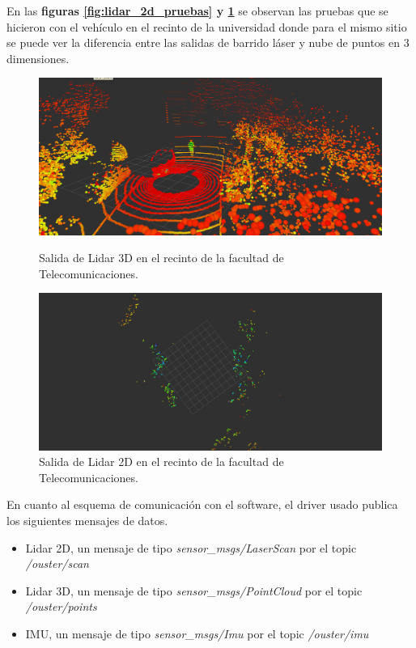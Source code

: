 En las \textbf{figuras \ref{fig:lidar_2d_pruebas} y \ref{fig:lidar_3d_pruebas}} se observan las pruebas que se hicieron con el vehículo en el recinto 
de la universidad donde para el mismo sitio se puede ver la diferencia entre las salidas de barrido láser y nube de puntos en 3 dimensiones.



\begin{figure}[htbp]
  \centering
  \begin{minipage}[b]{0.45\textwidth}
    \centering
    \includegraphics[width=\textwidth]{images/lidar3d_2.png}
    \caption{Salida de Lidar 3D en el recinto de la facultad de Telecomunicaciones.}
    \label{fig:lidar_2d_pruebas}
  \end{minipage}
  \hfill
  \begin{minipage}[b]{0.45\textwidth}
    \centering
    \includegraphics[width=\textwidth]{images/lidar2d.png}
    \caption{Salida de Lidar 2D en el recinto de la facultad de Telecomunicaciones.}
    \label{fig:lidar_3d_pruebas}
  \end{minipage}
\end{figure}

En cuanto al esquema de comunicación con el software, el driver usado publica los siguientes mensajes de datos.
\begin{itemize}
    \item Lidar 2D, un mensaje de tipo \textit{sensor\_msgs/LaserScan} por el topic \textit{/ouster/scan}
    \item Lidar 3D, un mensaje de tipo \textit{sensor\_msgs/PointCloud} por el topic \textit{/ouster/points}
    \item IMU, un mensaje de tipo \textit{sensor\_msgs/Imu} por el topic \textit{/ouster/imu}
\end{itemize}

